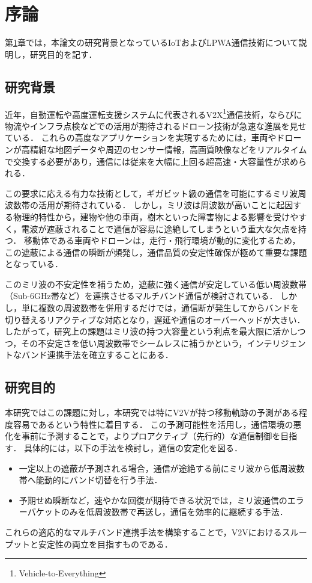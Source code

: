 \chapter{序論}\label{chap: 序論}
第\ref{chap: 序論}章では，本論文の研究背景となっているIoTおよびLPWA通信技術について説明し，研究目的を記す．

\section{研究背景}
    近年，自動運転や高度運転支援システムに代表されるV2X\footnote{Vehicle-to-Everything}通信技術，ならびに物流やインフラ点検などでの活用が期待されるドローン技術が急速な進展を見せている．
    これらの高度なアプリケーションを実現するためには，車両やドローンが高精細な地図データや周辺のセンサー情報，高画質映像などをリアルタイムで交換する必要があり，通信には従来を大幅に上回る超高速・大容量性が求められる．

    この要求に応える有力な技術として，ギガビット級の通信を可能にするミリ波周波数帯の活用が期待されている．
    しかし，ミリ波は周波数が高いことに起因する物理的特性から，建物や他の車両，樹木といった障害物による影響を受けやすく，電波が遮蔽されることで通信が容易に途絶してしまうという重大な欠点を持つ．
    移動体である車両やドローンは，走行・飛行環境が動的に変化するため，この遮蔽による通信の瞬断が頻発し，通信品質の安定性確保が極めて重要な課題となっている．

    このミリ波の不安定性を補うため，遮蔽に強く通信が安定している低い周波数帯（Sub-6GHz帯など）を連携させるマルチバンド通信が検討されている．
    しかし，単に複数の周波数帯を併用するだけでは，通信断が発生してからバンドを切り替えるリアクティブな対応となり，遅延や通信のオーバーヘッドが大きい．
    したがって，研究上の課題はミリ波の持つ大容量という利点を最大限に活かしつつ，その不安定さを低い周波数帯でシームレスに補うかという，インテリジェントなバンド連携手法を確立することにある．


\section{研究目的}
    本研究ではこの課題に対し，本研究では特にV2Vが持つ移動軌跡の予測がある程度容易であるという特性に着目する．
    この予測可能性を活用し，通信環境の悪化を事前に予測することで，よりプロアクティブ（先行的）な通信制御を目指す．
    具体的には，以下の手法を検討し，通信の安定化を図る．
    \begin{itemize}
        \item 一定以上の遮蔽が予測される場合，通信が途絶する前にミリ波から低周波数帯へ能動的にバンド切替を行う手法．
        \item 予期せぬ瞬断など，速やかな回復が期待できる状況では，ミリ波通信のエラーパケットのみを低周波数帯で再送し，通信を効率的に継続する手法．
    \end{itemize}
    これらの適応的なマルチバンド連携手法を構築することで，V2Vにおけるスループットと安定性の両立を目指すものである．\cite{8469875}
